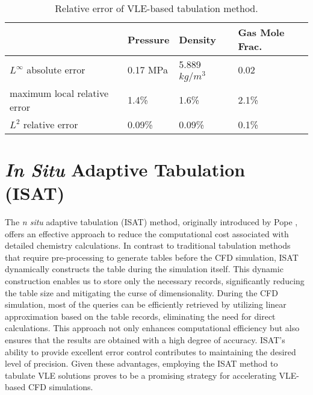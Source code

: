     \begin{table}[htbp]
        \centering
        \begin{minipage}{0.9\textwidth}
            \caption{Relative error of VLE-based tabulation method.} \label{table:error}
            \begin{center}
                \begin{tabular}{@{}l|lll@{}} %
                    \toprule
                                    &Pressure  & Density   & Gas Mole Frac.   \\ %
                    \midrule
                    $L^{\infty}$ absolute error           & 0.17 MPa        & 5.889 $kg/m^3$   & 0.02\\%
                    maximum local relative error          &  1.4\%           & 1.6\%   & 2.1\% \\ %
                     $L^2$ relative error               &  0.09\%           & 0.09\%   & 0.1\% \\ %
                    \bottomrule
                \end{tabular}

            \end{center}
        \end{minipage}

    \end{table}

\section{\textit{In Situ} Adaptive Tabulation (ISAT)}
\label{sec:ISAT}
The \textit{n situ} adaptive tabulation (ISAT) method, originally introduced by Pope \cite{pope1997computationally}, offers an effective approach to reduce the computational cost associated with detailed chemistry calculations. In contrast to traditional tabulation methods that require pre-processing to generate tables before the CFD simulation, ISAT dynamically constructs the table during the simulation itself. This dynamic construction enables us to store only the necessary records, significantly reducing the table size and mitigating the curse of dimensionality. During the CFD simulation, most of the queries can be efficiently retrieved by utilizing linear approximation based on the table records, eliminating the need for direct calculations. This approach not only enhances computational efficiency but also ensures that the results are obtained with a high degree of accuracy. ISAT's ability to provide excellent error control contributes to maintaining the desired level of precision. Given these advantages, employing the ISAT method to tabulate VLE solutions proves to be a promising strategy for accelerating VLE-based CFD simulations.

